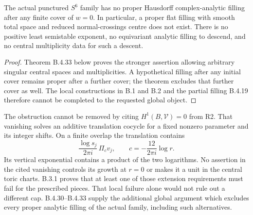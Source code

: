 \begin{corollary}\label{push:src:B.4.1}\label{push:B41}
The actual punctured $S^6$ family has no proper
Hausdorff complex-analytic filling after any finite
cover of $w=0$. In particular, a proper flat filling
with smooth total space and reduced normal-crossings
centre does not exist. There is no positive least
semistable exponent, no equivariant analytic filling
to descend, and no central multiplicity data for
such a descent.
\end{corollary}
\begin{proof}
Theorem B.4.33 below proves the stronger assertion
allowing arbitrary singular central spaces and
multiplicities. A hypothetical filling after any
initial cover remains proper after a further cover;
the theorem excludes that further cover as well.
The local constructions in B.1 and B.2 and the
partial filling B.4.19 therefore cannot be completed
to the requested global object.
\end{proof}

The obstruction cannot be removed by citing
$H^1(B,\mathcal V)=0$ from R2. That
vanishing solves an additive translation
cocycle for a fixed nonzero parameter and
its integer shifts. On a finite overlap
the translation contains
\[
 \frac{\log s_j}{2\pi i}\,\Pi_c v_j,
 \qquad c=-\frac{12}{2\pi i}\log r.
\]
Its vertical exponential contains a product
of the two logarithms. No assertion in
the cited vanishing controls its growth
at $r=0$ or makes it a unit in the central
toric charts. B.3.1 proves that at least
one of those extension requirements must
fail for the prescribed pieces. That local
failure alone would not rule out a different cap.
B.4.30--B.4.33 supply the additional global argument
which excludes every proper analytic filling of
the actual family, including such alternatives.


